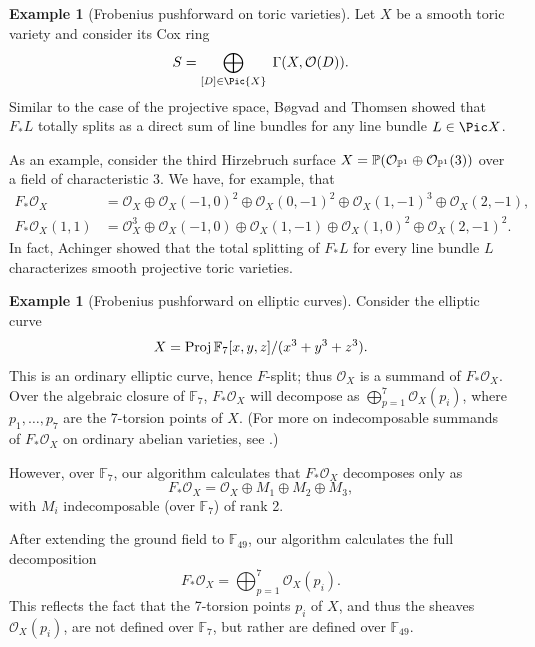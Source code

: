 \documentclass[12pt]{amsart}
\def\OO{\mathcal O}
\def\FF{\mathbb F}
\theoremstyle{theorem}
\numberwithin{thm}{section}
\theoremstyle{definition}
\newtheorem{exa}[thm]{Example}
\begin{document}
\begin{exa}[Frobenius pushforward on toric varieties]
  Let $X$ be a smooth toric variety and consider its Cox ring
  \[ S = \bigoplus_{[D]\in\Pic{X}} \; \Gamma(X, \OO(D)). \]
  Similar to the case of the projective space, B{\o}gvad and Thomsen \cite{Bogvad98,Thomsen00} showed that $F_*L$ totally splits as a direct sum of line bundles for any line bundle $L\in\Pic X$.

  As an example, consider the third Hirzebruch surface $X=\P(\OO_{\P^1}\oplus \OO_{\P^1}(3))$ over a field of characteristic 3. We have, for example, that
  \begin{align*}
    F_*\OO_X      &= \OO_X   \oplus \OO_X(-1,0)^2 \oplus \OO_X(0,-1)^2 \oplus \OO_X(1,-1)^3 \oplus \OO_X(2,-1), \\
    F_*\OO_X(1,1) &= \OO_X^3 \oplus \OO_X(-1,0)   \oplus \OO_X(1,-1)   \oplus \OO_X(1, 0)^2 \oplus \OO_X(2,-1)^2.
  \end{align*}
  In fact, Achinger \cite{Achinger15} showed that the total splitting of $F_*L$ for every line bundle $L$ characterizes smooth projective toric varieties.
\end{exa}

\begin{exa}[Frobenius pushforward on elliptic curves]\label{ex:elliptic}
  Consider the elliptic curve
  \[ X = \Proj \FF_7[x,y,z]/(x^3+y^3+z^3). \]
  This is an ordinary elliptic curve,
 hence $F$-split; thus $\OO_X$ is a summand of $F_* \OO_X$. Over the algebraic closure of $\FF_7$, $F_*\OO_X$ will decompose as $\bigoplus_{p=1}^7 \OO_X(p_i)$, where $p_1,\dots,p_7$ are the 7-torsion points of $X$. (For more on indecomposable summands of $F_*\OO_X$ on ordinary abelian varieties, see \cite{Tango,ST}.)

  However, over $\FF_7$, our algorithm calculates that $F_*\OO_X$ decomposes only as
  $$ F_* \OO_X =\OO_X \oplus M_1\oplus M_2\oplus M_3, $$
  with $M_i$ indecomposable (over $\FF_7$) of rank 2.

  After extending the ground field to $\FF_{49}$, our algorithm calculates the full decomposition
  $$ F_* \OO_X=\bigoplus_{p=1}^7 \OO_X(p_i). $$
  This reflects the fact that the 7-torsion points $p_i$ of $X$, and thus the sheaves $\OO_X(p_i)$, are not defined over $\FF_7$, but rather are defined over $\FF_{49}$.
\end{exa}
\end{document}
